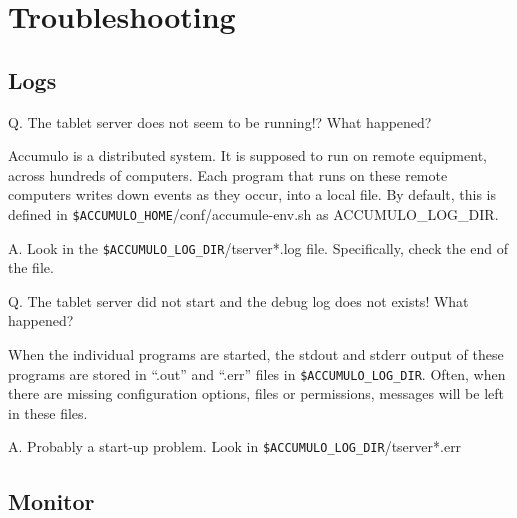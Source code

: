 %
%

\chapter{Troubleshooting}

\section{Logs}

Q. The tablet server does not seem to be running!? What happened?

Accumulo is a distributed system.  It is supposed to run on remote
equipment, across hundreds of computers.  Each program that runs on
these remote computers writes down events as they occur, into a local
file. By default, this is defined in
\texttt{\$ACCUMULO\_HOME}/conf/accumule-env.sh as ACCUMULO\_LOG\_DIR.

A. Look in the \texttt{\$ACCUMULO\_LOG\_DIR}/tserver*.log file.  Specifically, check the end of the file.

Q. The tablet server did not start and the debug log does not exists!  What happened?

When the individual programs are started, the stdout and stderr output
of these programs are stored in ``.out'' and ``.err'' files in
\texttt{\$ACCUMULO\_LOG\_DIR}.  Often, when there are missing configuration
options, files or permissions, messages will be left in these files.

A. Probably a start-up problem.  Look in \texttt{\$ACCUMULO\_LOG\_DIR}/tserver*.err

\section{Monitor}

